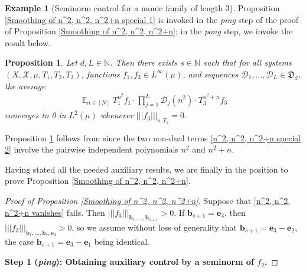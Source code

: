 \documentclass[11pt]{amsart}
\newtheorem{proposition}[lemma]{Proposition}
\theoremstyle{definition}
\newtheorem{example}{Example}
\newcommand{\N}{{\mathbb N}}
\newcommand{\CD}{{\mathcal D}}
\newcommand{\CX}{{\mathcal X}}
\newcommand{\FD}{{\mathfrak D}}
\newcommand{\be}{{\mathbf{e}}}
\renewcommand{\b}{{\textbf{b}}}
\newcommand{\nnorm}[1]{\lvert\!|\!| #1|\!|\!\rvert}
\DeclareMathOperator*{\E}{\mathbb{E}}
\begin{document}
\begin{example}[Seminorm control for a monic family of length 3]
Proposition \ref{Smoothing of n^2, n^2, n^2+n special 1} is invoked in the \textit{ping} step of the proof of Proposition \ref{Smoothing of n^2, n^2, n^2+n}; in the \textit{pong} step, we invoke the result below.
\begin{proposition}\label{Smoothing of n^2, n^2, n^2+n special 2}
    Let $d, L\in \N$. Then there exists $s\in\N$ such that for all systems $(X, \CX, \mu, T_1, T_2, T_3)$,  functions $f_1, f_3\in L^\infty(\mu)$, and sequences $\CD_1, \ldots, \CD_L\in\FD_d$, the average
\begin{align}\label{n^2, n^2, n^2+n special 2}
    \E_{n\in[N]}T_1^{n^2} f_1 \cdot \prod_{j=1}^L \CD_{j}(n^2) \cdot T_3^{n^2+n}f_3
\end{align}
converges to 0 in $L^2(\mu)$  whenever $\nnorm{f_3}_{s, T_3} = 0$.
\end{proposition}
Proposition \ref{Smoothing of n^2, n^2, n^2+n special 2}
follows from \cite[Proposition 8.4]{FrKu22} since the two non-dual terms \eqref{n^2, n^2, n^2+n special 2} involve the pairwise independent polynomials $n^2$ and $n^2+n$.

Having stated all the needed auxiliary results, we are finally in the position to prove Proposition \ref{Smoothing of n^2, n^2, n^2+n}.
\begin{proof}[Proof of Proposition \ref{Smoothing of n^2, n^2, n^2+n}]




Suppose that \eqref{n^2, n^2, n^2+n vanishes} fails. Then $\nnorm{f_3}_{\b_1, \ldots, \b_{s+1}}>0$. If $\b_{s+1} = \be_3$, then $\nnorm{f_3}_{\b_1, \ldots, \b_{s}, \be_3}>0$, so we assume without loss of generality that $\b_{s+1} = \be_3 - \be_2$, the case $\b_{s+1} = \be_3 - \be_1$ being identical.

\smallskip

\textbf{Step 1 (\textit{ping}): Obtaining auxiliary control by a seminorm of $f_2$.}

\smallskip


\end{proof}
\end{example}
\end{document}
